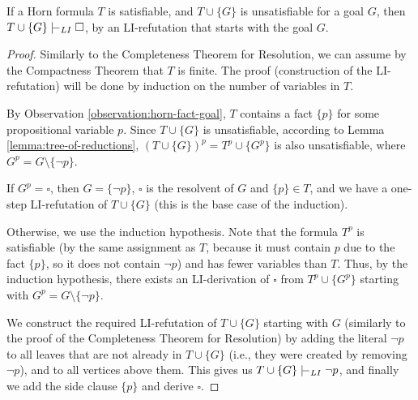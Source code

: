 \begin{theorem}\label{theorem:completeness-of-li-resolution-for-horn}
If a Horn formula $T$ is satisfiable, and $T\cup\{G\}$ is unsatisfiable for a goal $G$, then $T\cup\{G\}\proves_{LI}\square$, by an LI-refutation that starts with the goal $G$.   
\end{theorem}
\begin{proof}
    Similarly to the Completeness Theorem for Resolution, we can assume by the Compactness Theorem that $T$ is finite. The proof (construction of the LI-refutation) will be done by induction on the number of variables in $T$.

    By Observation \ref{observation:horn-fact-goal}, $T$ contains a fact $\{p\}$ for some propositional variable $p$. Since $T\cup\{G\}$ is unsatisfiable, according to Lemma \ref{lemma:tree-of-reductions}, $(T\cup\{G\})^p=T^p\cup\{G^p\}$ is also unsatisfiable, where $G^p=G\setminus\{\neg p\}$.
    
    If $G^p=\square$, then $G=\{\neg p\}$, $\square$ is the resolvent of $G$ and $\{p\}\in T$, and we have a one-step LI-refutation of $T\cup\{G\}$ (this is the base case of the induction). 
    
    Otherwise, we use the induction hypothesis. Note that the formula $T^p$ is satisfiable (by the same assignment as $T$, because it must contain $p$ due to the fact $\{p\}$, so it does not contain $\neg p$) and has fewer variables than $T$. Thus, by the induction hypothesis, there exists an LI-derivation of $\square$ from $T^p\cup\{G^p\}$ starting with $G^p=G\setminus\{\neg p\}$.

    We construct the required LI-refutation of $T\cup\{G\}$ starting with $G$ (similarly to the proof of the Completeness Theorem for Resolution) by adding the literal $\neg p$ to all leaves that are not already in $T\cup\{G\}$ (i.e., they were created by removing $\neg p$), and to all vertices above them. This gives us $T\cup\{G\}\proves_{LI}\neg p$, and finally we add the side clause $\{p\}$ and derive $\square$.
\end{proof}

